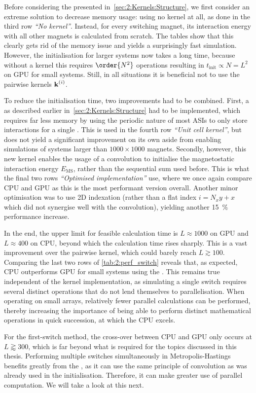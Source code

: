 Before considering the  presented in~\cref{sec:2:Kernels:Structure}, we first consider an extreme solution to decrease memory usage: using no kernel at all, as done in the third row \textit{``No kernel''}.
Instead, for every switching magnet, its interaction energy with all other magnets is calculated from scratch.
The tables show that this clearly gets rid of the memory issue and yields a surprisingly fast simulation.
However, the initialisation for larger systems now takes a long time, because without a kernel this requires $\order{N^2}$ operations resulting in $t_\mathrm{init} \propto N=L^2$ on GPU for small systems.
Still, in all situations it is beneficial not to use the pairwise kernels $\boldsymbol{\mathbf{k}}^{(i)}$. \\\par

To reduce the initialisation time, two improvements had to be combined.
First, a  as described earlier in~\cref{sec:2:Kernels:Structure} had to be implemented, which requires far less memory by using the periodic nature of most ASIs to only store interactions for a single .
This is used in the fourth row \textit{``Unit cell kernel''}, but does not yield a significant improvement on its own aside from enabling simulations of systems larger than $1000 \times 1000$ magnets.
Secondly, however, this new kernel enables the usage of a convolution to initialise the magnetostatic interaction energy $E_\mathrm{MS}$, rather than the sequential sum used before.
This is what the final two rows \textit{``Optimised implementation''} use, where we once again compare CPU and GPU as this is the most performant version overall.
Another minor optimisation was to use 2D indexation (rather than a flat index $i = N_x y + x$ which did not synergise well with the convolution), yielding another \SI{15}{\percent} performance increase. \newpage

In the end, the upper limit for feasible calculation time is $L \approx 1000$ on GPU and $L \approx 400$ on CPU, beyond which the calculation time rises sharply.
This is a vast improvement over the pairwise kernel, which could barely reach $L \gtrsim 100$.
Comparing the last two rows of \cref{tab:2:perf_switch} reveals that, as expected, CPU outperforms GPU for small systems using the .
This remains true independent of the kernel implementation, as simulating a single switch requires several distinct operations that do not lend themselves to parallelisation.
When operating on small arrays, relatively fewer parallel calculations can be performed, thereby increasing the importance of being able to perform distinct mathematical operations in quick succession, at which the CPU excels. \par
For the first-switch method, the cross-over between CPU and GPU only occurs at $L \gtrapprox 300$, which is far beyond what is required for the topics discussed in this thesis.
Performing multiple switches simultaneously in Metropolis-Hastings benefits greatly from the , as it can use the same principle of convolution as was already used in the initialisation.
Therefore, it can make greater use of parallel computation.
We will take a look at this next.

